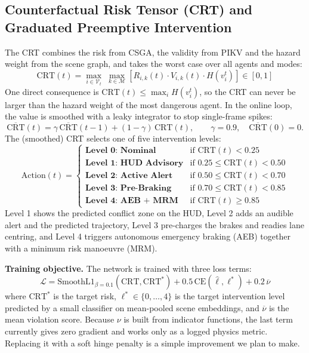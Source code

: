 \documentclass[preprint,12pt]{elsarticle}
\begin{document}
\subsection{Counterfactual Risk Tensor (CRT) and Graduated Preemptive Intervention}
The CRT combines the risk from CSGA, the validity from PIKV and the hazard weight from the scene graph, and takes the worst case over all agents and modes:
\begin{equation}
    \text{CRT}(t) = \max_{i \in \mathcal{V}_t} \; \max_{k \in \mathcal{M}} \left[R_{i,k}(t) \cdot V_{i,k}(t) \cdot H(v_i^t)\right] \in [0, 1]
    \label{eq_crt}
\end{equation}
One direct consequence is $\text{CRT}(t) \le \max_i H(v_i^t)$, so the CRT can never be larger than the hazard weight of the most dangerous agent. In the online loop, the value is smoothed with a leaky integrator to stop single-frame spikes:
\begin{equation}
    \overline{\text{CRT}}(t) = \gamma \, \overline{\text{CRT}}(t-1) + (1 - \gamma) \, \text{CRT}(t), \qquad \gamma = 0.9, \quad \overline{\text{CRT}}(0) = 0.
    \label{eq_smooth}
\end{equation}
The (smoothed) CRT selects one of five intervention levels:
\begin{equation}
    \text{Action}(t) = \begin{cases}
    \textbf{Level 0: Nominal} & \text{if } \text{CRT}(t) < 0.25 \\
    \textbf{Level 1: HUD Advisory} & \text{if } 0.25 \le \text{CRT}(t) < 0.50 \\
    \textbf{Level 2: Active Alert} & \text{if } 0.50 \le \text{CRT}(t) < 0.70 \\
    \textbf{Level 3: Pre-Braking} & \text{if } 0.70 \le \text{CRT}(t) < 0.85 \\
    \textbf{Level 4: AEB + MRM} & \text{if } \text{CRT}(t) \ge 0.85
    \end{cases}
    \label{eq_intervention}
\end{equation}
Level 1 shows the predicted conflict zone on the HUD, Level 2 adds an audible alert and the predicted trajectory, Level 3 pre-charges the brakes and readies lane centring, and Level 4 triggers autonomous emergency braking (AEB) together with a minimum risk manoeuvre (MRM).

\textbf{Training objective.} The network is trained with three loss terms:
\begin{equation}
    \mathcal{L} = \text{SmoothL1}_{\beta = 0.1}\left(\text{CRT}, \text{CRT}^{*}\right) + 0.5 \, \text{CE}\left(\hat{\ell}, \ell^{*}\right) + 0.2 \, \overline{\nu}
    \label{eq_loss}
\end{equation}
where $\text{CRT}^{*}$ is the target risk, $\ell^{*} \in \{0, \dots, 4\}$ is the target intervention level predicted by a small classifier on mean-pooled scene embeddings, and $\overline{\nu}$ is the mean violation score. Because $\nu$ is built from indicator functions, the last term currently gives zero gradient and works only as a logged physics metric. Replacing it with a soft hinge penalty is a simple improvement we plan to make.
\end{document}
